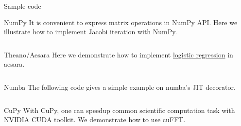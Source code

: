 \begin{newSec}{Sample code}
	\begin{newSubsec}{NumPy}
		It is convenient to express matrix operations in NumPy API. Here we illustrate how to implement Jacobi iteration with NumPy.
		\inputminted{python}{src/numpy.py}
	\end{newSubsec}
	\begin{newSubsec}{Theano/Aesara}
		Here we demonstrate how to implement \href{https://aesara.readthedocs.io/en/latest/tutorial/examples.html#a-real-example-logistic-regression}{logistic regression} in aesara.
		\inputminted{python}{src/theano.py}
	\end{newSubsec}
	\begin{newSubsec}{Numba}
		The following code gives a simple example on numba's JIT decorator.
		\inputminted{python}{src/numba.py}
	\end{newSubsec}
	\begin{newSubsec}{CuPy}
		With CuPy, one can speedup common scientific computation task with NVIDIA CUDA toolkit.
		We demonstrate how to use cuFFT.
		\inputminted{python}{src/cupy.py}
	\end{newSubsec}
\end{newSec}
